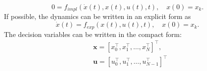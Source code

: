 \documentclass{article}
\begin{document}
\begin{equation}
0=f_{impl}(\dot{x}(t), x(t),u(t),t),\quad x(0)=x_k.
\end{equation}
If possible, the dynamics can be written in an explicit form as
\begin{equation}
\dot{x}(t)=f_{exp}(x(t),u(t),t),\quad x(0)=x_k.
\end{equation}
The decision variables can be written in the compact form:
\begin{equation}
\begin{aligned}
&\mathbf{x}= \left [x_0^\top, x_1^\top,\dots, x_N^\top\right ]^\top,\\
&\mathbf{u}= \left [u_0^\top, u_1^\top,\dots, u_{N-1}^\top\right ]^\top
\end{aligned}
\end{equation}
\end{document}
